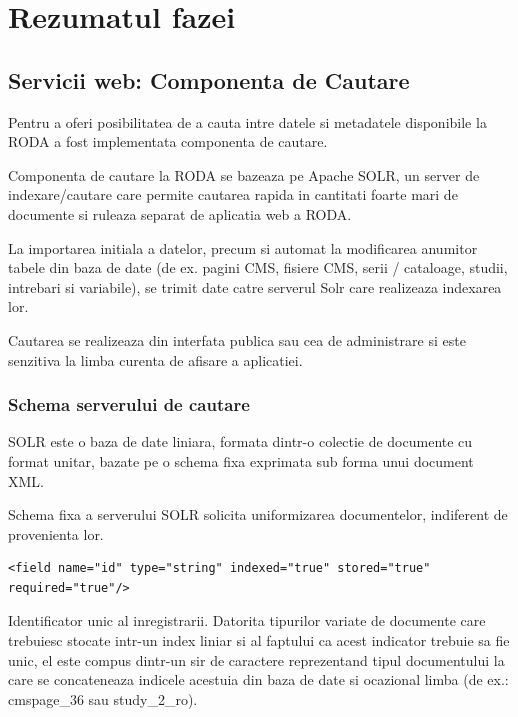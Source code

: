 \documentclass[a4paper, 10pt]{article}
\begin{document}
{\section{Rezumatul fazei}

\medskip

\subsection{Servicii web: Componenta de Cautare}

Pentru a oferi posibilitatea de a cauta intre datele si metadatele disponibile la RODA 
a fost implementata componenta de cautare.

Componenta de cautare la RODA se bazeaza pe Apache SOLR, un server de indexare/cautare care permite cautarea rapida in cantitati foarte mari de documente 
si ruleaza separat de aplicatia web a RODA. 

La importarea initiala a datelor, precum si automat la modificarea anumitor tabele din baza de date 
(de ex. pagini CMS, fisiere CMS, serii / cataloage, studii, intrebari si variabile), 
se trimit date catre serverul Solr care realizeaza indexarea lor.

Cautarea se realizeaza din interfata publica sau cea de administrare 
si este senzitiva la limba curenta de afisare a aplicatiei.

\subsubsection{Schema serverului de cautare}

SOLR este o baza de date liniara, formata dintr-o colectie de documente cu format unitar, 
bazate pe o schema fixa exprimata sub forma unui document XML. 

Schema fixa a serverului SOLR solicita uniformizarea documentelor, indiferent de provenienta lor. 

\begin{lstlisting}[breaklines=true]
<field name="id" type="string" indexed="true" stored="true" required="true"/>
\end{lstlisting}

Identificator unic al inregistrarii. 
Datorita tipurilor variate de documente care trebuiesc stocate intr-un index liniar si al faptului ca acest indicator trebuie sa fie unic, 
el este compus dintr-un sir de caractere reprezentand tipul documentului la care se concateneaza indicele acestuia din baza de date si ocazional limba 
(de ex.: cmspage\_36 sau study\_2\_ro). 

}
\end{document}
